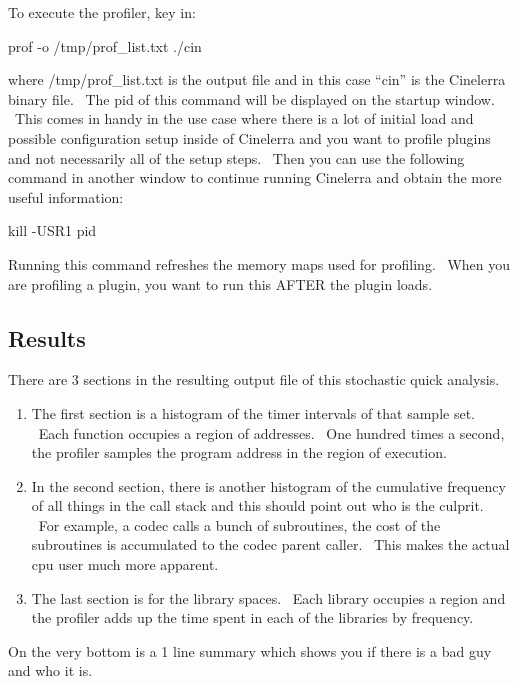 To execute the profiler, key in: \ \ 
\medskip

\hspace{2em}prof -o /tmp/prof\_list.txt ./cin
\medskip

where /tmp/prof\_list.txt is the output file and in this case ``cin'' is the Cinelerra binary file. \ The pid of this command will be displayed on the startup window. \ This comes in handy in the use case where there is a lot of initial load and possible configuration setup inside of Cinelerra and you want to profile plugins and not necessarily all of the setup steps. \ Then you can use the following command in another window to continue running Cinelerra and obtain the more useful information:
\medskip

\hspace{2em}kill -USR1 pid
\medskip

Running this command refreshes the memory maps used for profiling. \ When you are profiling a plugin, you want to run this AFTER the plugin loads.
\medskip

\subsection{Results}

There are 3 sections in the resulting output file of this stochastic quick analysis.
\medskip

\begin{enumerate}[nosep]
	\item The first section is a histogram of the timer intervals of that sample set. \ Each function occupies a region of addresses. \ One hundred times a second, the profiler samples the program address in the region of execution.
	\item In the second section, there is another histogram of the cumulative frequency of all things in the call stack and this should point out who is the culprit. \ For example, a codec calls a bunch of subroutines, the cost of the subroutines is accumulated to the codec parent caller. \ This makes the actual cpu user much more apparent.
	\item The last section is for the library spaces. \ Each library occupies a region and the profiler adds up the time spent in each of the libraries by frequency.
\end{enumerate}
\smallskip

On the very bottom is a 1 line summary which shows you if there is a bad guy and who it is.
\medskip


